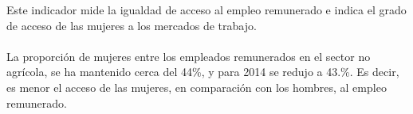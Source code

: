 Este indicador mide la igualdad de acceso al empleo remunerado e indica el grado de acceso de las mujeres a los mercados de trabajo. \\\\
La proporción de mujeres entre los empleados remunerados en el sector no agrícola, se ha mantenido cerca del 44\%, y para 2014 se redujo  a 43.\%. Es decir, es menor el acceso de las mujeres, en comparación con los hombres, al empleo remunerado.
